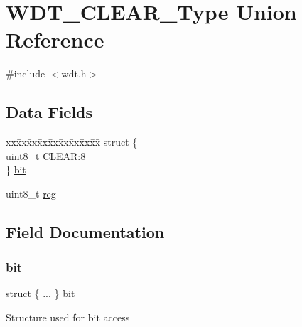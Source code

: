 \hypertarget{union_w_d_t___c_l_e_a_r___type}{}\section{W\+D\+T\+\_\+\+C\+L\+E\+A\+R\+\_\+\+Type Union Reference}
\label{union_w_d_t___c_l_e_a_r___type}


{\ttfamily \#include $<$wdt.\+h$>$}

\subsection*{Data Fields}
\begin{DoxyCompactItemize}
\item 
\begin{tabbing}
xx\=xx\=xx\=xx\=xx\=xx\=xx\=xx\=xx\=\kill
struct \{\\
\>uint8\_t \mbox{\hyperlink{union_w_d_t___c_l_e_a_r___type_afc0972755c7c7ceee46a6d2ea70b34e7}{CLEAR}}:8\\
\} \mbox{\hyperlink{union_w_d_t___c_l_e_a_r___type_a61c360f5edf1a29f47244b5000c6a507}{bit}}\\

\end{tabbing}\item 
uint8\+\_\+t \mbox{\hyperlink{union_w_d_t___c_l_e_a_r___type_a9428adc9af4653a2050e2536b55dec8d}{reg}}
\end{DoxyCompactItemize}


\subsection{Field Documentation}
\mbox{\label{union_w_d_t___c_l_e_a_r___type_a61c360f5edf1a29f47244b5000c6a507}} 
\subsubsection{\texorpdfstring{bit}{bit}}
{\footnotesize\ttfamily struct \{ ... \}   bit}

Structure used for bit access \mbox{\label{union_w_d_t___c_l_e_a_r___type_afc0972755c7c7ceee46a6d2ea70b34e7}} 
